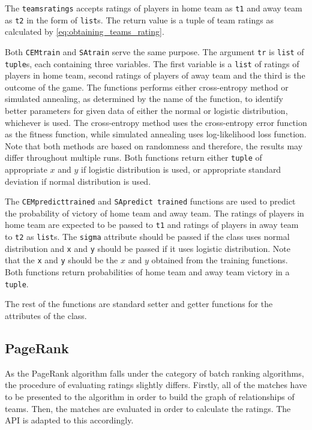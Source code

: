 \noindent The \texttt{teams\textunderscore ratings} accepts ratings of players in home team as \texttt{t1} and away team as \texttt{t2} in the form of \texttt{list}s. The return value is a tuple of team ratings as calculated by \eqref{eq:obtaining_teams_rating}.

\noindent Both \texttt{CEM\textunderscore train} and \texttt{SA\textunderscore train} serve the same purpose. The argument \texttt{tr} is \texttt{list} of \texttt{tuple}s, each containing three variables. The first variable is a \texttt{list} of ratings of players in home team, second ratings of players of away team and the third is the outcome of the game. The functions performs either cross-entropy method or simulated annealing, as determined by the name of the function, to identify better parameters for given data of either the normal or logistic distribution, whichever is used. The cross-entropy method uses the cross-entropy error function as the fitness function, while simulated annealing uses log-likelihood loss function. Note that both methods are based on randomness and therefore, the results may differ throughout multiple runs. Both functions return either \texttt{tuple} of appropriate $x$ and $y$ if logistic distribution is used, or appropriate standard deviation if normal distribution is used.

\noindent The \texttt{CEM\textunderscore predict\textunderscore trained} and \texttt{SA\textunderscore predict \textunderscore trained} functions are used to predict the probability of victory of home team and away team. The ratings of players in home team are expected to be passed to \texttt{t1} and ratings of players in away team to \texttt{t2} as \texttt{list}s. The \texttt{sigma} attribute should be passed if the class uses normal distribution and \texttt{x} and \texttt{y} should be passed if it uses logistic distribution. Note that the \texttt{x} and \texttt{y} should be the $x$ and $y$ obtained from the training functions. Both functions return probabilities of home team and away team victory in a \texttt{tuple}.

\noindent The rest of the functions are standard setter and getter functions for the attributes of the class.

\subsection{PageRank}
As the PageRank algorithm falls under the category of batch ranking algorithms, the procedure of evaluating ratings slightly differs. Firstly, all of the matches have to be presented to the algorithm in order to build the graph of relationships of teams. Then, the matches are evaluated in order to calculate the ratings. The API is adapted to this accordingly.

